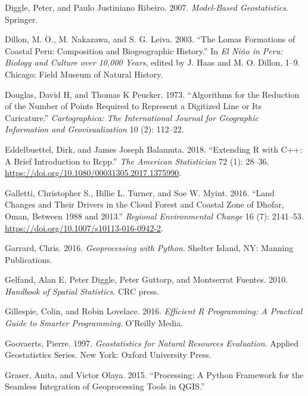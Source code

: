 \documentclass[]{krantz}
\begin{document}
\leavevmode\hypertarget{ref-diggle_modelbased_2007}{}%
Diggle, Peter, and Paulo Justiniano Ribeiro. 2007. \emph{Model-Based Geostatistics}. Springer.

\leavevmode\hypertarget{ref-dillon_lomas_2003}{}%
Dillon, M. O., M. Nakazawa, and S. G. Leiva. 2003. ``The Lomas Formations of Coastal Peru: Composition and Biogeographic History.'' In \emph{El Niño in Peru: Biology and Culture over 10,000 Years}, edited by J. Haas and M. O. Dillon, 1--9. Chicago: Field Museum of Natural History.

\leavevmode\hypertarget{ref-douglas_algorithms_1973}{}%
Douglas, David H, and Thomas K Peucker. 1973. ``Algorithms for the Reduction of the Number of Points Required to Represent a Digitized Line or Its Caricature.'' \emph{Cartographica: The International Journal for Geographic Information and Geovisualization} 10 (2): 112--22.

\leavevmode\hypertarget{ref-eddelbuettel_extending_2018}{}%
Eddelbuettel, Dirk, and James Joseph Balamuta. 2018. ``Extending R with C++: A Brief Introduction to Rcpp.'' \emph{The American Statistician} 72 (1): 28--36. \url{https://doi.org/10.1080/00031305.2017.1375990}.

\leavevmode\hypertarget{ref-galletti_land_2016}{}%
Galletti, Christopher S., Billie L. Turner, and Soe W. Myint. 2016. ``Land Changes and Their Drivers in the Cloud Forest and Coastal Zone of Dhofar, Oman, Between 1988 and 2013.'' \emph{Regional Environmental Change} 16 (7): 2141--53. \url{https://doi.org/10.1007/s10113-016-0942-2}.

\leavevmode\hypertarget{ref-garrard_geoprocessing_2016}{}%
Garrard, Chris. 2016. \emph{Geoprocessing with Python}. Shelter Island, NY: Manning Publications.

\leavevmode\hypertarget{ref-gelfand_handbook_2010}{}%
Gelfand, Alan E, Peter Diggle, Peter Guttorp, and Montserrat Fuentes. 2010. \emph{Handbook of Spatial Statistics}. CRC press.

\leavevmode\hypertarget{ref-gillespie_efficient_2016}{}%
Gillespie, Colin, and Robin Lovelace. 2016. \emph{Efficient R Programming: A Practical Guide to Smarter Programming}. O'Reilly Media.

\leavevmode\hypertarget{ref-goovaerts_geostatistics_1997}{}%
Goovaerts, Pierre. 1997. \emph{Geostatistics for Natural Resources Evaluation}. Applied Geostatistics Series. New York: Oxford University Press.

\leavevmode\hypertarget{ref-graser_processing_2015}{}%
Graser, Anita, and Victor Olaya. 2015. ``Processing: A Python Framework for the Seamless Integration of Geoprocessing Tools in QGIS.''
\end{document}
